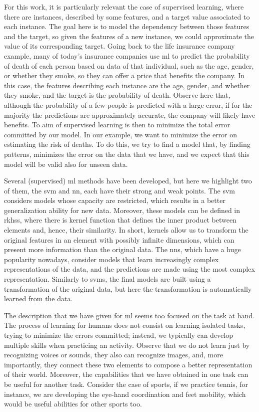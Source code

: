 For this work, it is particularly relevant the case of supervised learning, where there are instances, described by some features, and a target value associated to each instance. The goal here is to model the dependency between those features and the target, so given the features of a new instance, we could approximate the value of its corresponding target. Going back to the life insurance company example, many of today's insurance companies use \acrshort{ml} to predict the probability of death of each person based on data of that individual, such as the age, gender, or whether they smoke, so they can offer a price that benefits the company. In this case, the features describing each instance are the age, gender, and whether they smoke, and the target is the probability of death.
%
Observe here that, although the probability of a few people is predicted with a large error, if for the majority the predictions are approximately accurate, the company will likely have benefits.
%
To aim of supervised learning is then to minimize the total error committed by our model. In our example, we want to minimize the error on estimating the risk of deaths.
%
To do this, we try to find a model that, by finding patterns, minimizes the error on the data that we have, and we expect that this model will be valid also for unseen data.

Several (supervised) \acrshort{ml} methods have been developed, but here we highlight two of them, the \acrfull{svm} and \acrfull{nn}, each have their strong and weak points. 
%
The \acrfull{svm} considers models whose capacity are restricted, which results in a better generalization ability for new data. Moreover, these models can be defined in \acrfull{rkhss}, where there is kernel function that defines the inner product between elements and, hence, their similarity. In short, kernels allow us to transform the original features in an element with possibly infinite dimensions, which can present more information than the original data. 
%
The \acrfull{nns}, which have a huge popularity nowadays, consider models that learn increasingly complex representations of the data, and the predictions are made using the most complex representation. Similarly to \acrshort{svms}, the final models are built using a transformation of the original data, but here the transformation is automatically learned from the data.

The description that we have given for \acrshort{ml} seems too focused on the task at hand. The process of learning for humans does not consist on learning isolated tasks, trying to minimize the errors committed; instead, we typically can develop multiple skills when practicing an activity. Observe that we do not learn just by recognizing voices or sounds, they also can recognize images, and, more importantly, they connect these two elements to compose a better representation of their world.
Moreover, the capabilities that we have obtained in one task can be useful for another task. Consider the case of sports, if we practice tennis, for instance, we are developing the eye-hand coordination and feet mobility, which would be useful abilities for other sports too.
%


